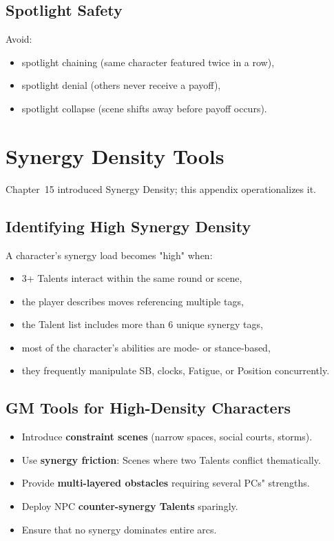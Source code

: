 \documentclass[11pt]{book}
\begin{document}
\subsection{Spotlight Safety}

Avoid:
\begin{itemize}
    \item spotlight chaining (same character featured twice in a row),
    \item spotlight denial (others never receive a payoff),
    \item spotlight collapse (scene shifts away before payoff occurs).
\end{itemize}

\section{Synergy Density Tools}

Chapter~15 introduced Synergy Density; this appendix operationalizes it.

\subsection{Identifying High Synergy Density}

A character's synergy load becomes "high" when:
\begin{itemize}
    \item 3+ Talents interact within the same round or scene,
    \item the player describes moves referencing multiple tags,
    \item the Talent list includes more than 6 unique synergy tags,
    \item most of the character's abilities are mode- or stance-based,
    \item they frequently manipulate SB, clocks, Fatigue, or Position concurrently.
\end{itemize}

\subsection{GM Tools for High-Density Characters}

\begin{itemize}
    \item Introduce \textbf{constraint scenes} (narrow spaces, social courts, storms).
    \item Use \textbf{synergy friction}:  
    Scenes where two Talents conflict thematically.
    \item Provide \textbf{multi-layered obstacles} requiring several PCs" strengths.
    \item Deploy NPC \textbf{counter-synergy Talents} sparingly.
    \item Ensure that no synergy dominates entire arcs.
\end{itemize}
\end{document}
